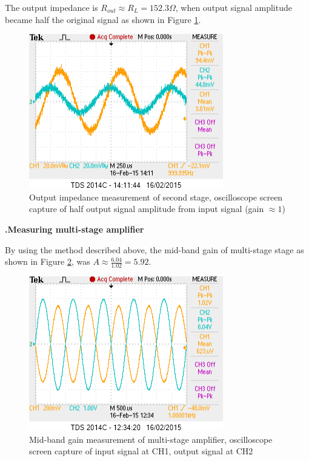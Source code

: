 \documentclass[a4paper,notitlepage,10pt]{report}
\newcommand{\tab}{\hspace{0.75cm}}
\newcommand{\fontSubHeading}{\fontsize{10pt}{11pt}\selectfont}
\newcounter{sections}
\newcounter{subsections}[sections]
\begin{document}
\begin{multicols}{2}
The output impedance is $R_{out} \approx R_L = 152.3\Omega$, when output signal amplitude became half the original signal as shown in Figure \ref{fig:lab_cc_rout}.
\parskip=0pt

\begin{figure}[H]
	\centering
	\includegraphics[width=0.85\columnwidth]{labccrout}
	\caption{Output impedance measurement of second stage, oscilloscope screen capture of half output signal amplitude from input signal (gain $\approx 1$)}
	\label{fig:lab_cc_rout}
\end{figure}
\parskip=6pt

\fontSubHeading
{}
\textbf{.\tab Measuring multi-stage amplifier}

By using the method described above, the mid-band gain of multi-stage stage as shown in Figure \ref{fig:lab_multi_gain}, was $A \approx \frac{6.04}{1.02} = 5.92$.
\parskip=0pt

\begin{figure}[H]
	\centering
	\includegraphics[width=0.85\columnwidth]{labmultigain}
	\caption{Mid-band gain measurement of multi-stage amplifier, oscilloscope screen capture of input signal at CH1, output signal at CH2}
	\label{fig:lab_multi_gain}
\end{figure}
\parskip=6pt


\end{multicols}
\end{document}
